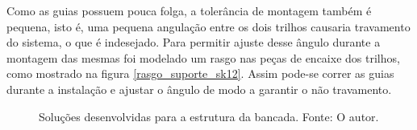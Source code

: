 Como as guias possuem pouca folga, a tolerância de montagem também é pequena, isto é, uma pequena angulação entre os dois trilhos causaria travamento do sistema, o que é indesejado. Para permitir ajuste desse ângulo durante a montagem das mesmas foi modelado um rasgo nas peças de encaixe dos trilhos, como mostrado na figura \ref{rasgo_suporte_sk12}. Assim pode-se correr as guias durante a instalação e ajustar o ângulo de modo a garantir o não travamento.

\begin{figure}[!ht]
    \centering
    \caption{Soluções desenvolvidas para a estrutura da bancada. Fonte: O autor.}
        \label{rasgo_suporte_sk12}
        \qquad
        \label{guias_lineares}
\end{figure}

